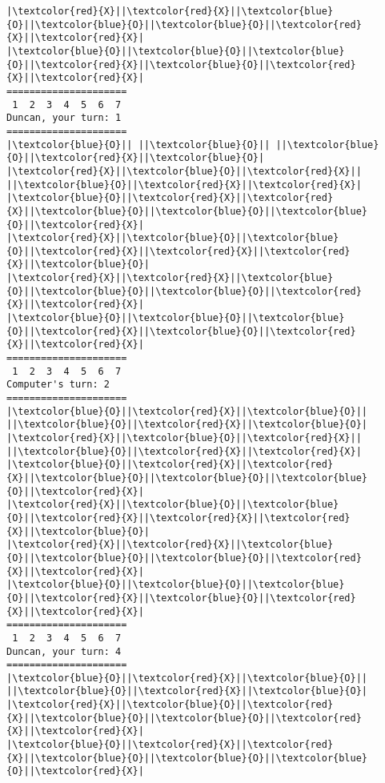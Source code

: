 \documentclass{article}
\begin{document}
\begin{Verbatim}[commandchars=\\\{\}]
|\textcolor{red}{X}||\textcolor{red}{X}||\textcolor{blue}{O}||\textcolor{blue}{O}||\textcolor{blue}{O}||\textcolor{red}{X}||\textcolor{red}{X}|
|\textcolor{blue}{O}||\textcolor{blue}{O}||\textcolor{blue}{O}||\textcolor{red}{X}||\textcolor{blue}{O}||\textcolor{red}{X}||\textcolor{red}{X}|
=====================
 1  2  3  4  5  6  7
Duncan, your turn: 1
=====================
|\textcolor{blue}{O}|| ||\textcolor{blue}{O}|| ||\textcolor{blue}{O}||\textcolor{red}{X}||\textcolor{blue}{O}|
|\textcolor{red}{X}||\textcolor{blue}{O}||\textcolor{red}{X}|| ||\textcolor{blue}{O}||\textcolor{red}{X}||\textcolor{red}{X}|
|\textcolor{blue}{O}||\textcolor{red}{X}||\textcolor{red}{X}||\textcolor{blue}{O}||\textcolor{blue}{O}||\textcolor{blue}{O}||\textcolor{red}{X}|
|\textcolor{red}{X}||\textcolor{blue}{O}||\textcolor{blue}{O}||\textcolor{red}{X}||\textcolor{red}{X}||\textcolor{red}{X}||\textcolor{blue}{O}|
|\textcolor{red}{X}||\textcolor{red}{X}||\textcolor{blue}{O}||\textcolor{blue}{O}||\textcolor{blue}{O}||\textcolor{red}{X}||\textcolor{red}{X}|
|\textcolor{blue}{O}||\textcolor{blue}{O}||\textcolor{blue}{O}||\textcolor{red}{X}||\textcolor{blue}{O}||\textcolor{red}{X}||\textcolor{red}{X}|
=====================
 1  2  3  4  5  6  7
Computer's turn: 2
=====================
|\textcolor{blue}{O}||\textcolor{red}{X}||\textcolor{blue}{O}|| ||\textcolor{blue}{O}||\textcolor{red}{X}||\textcolor{blue}{O}|
|\textcolor{red}{X}||\textcolor{blue}{O}||\textcolor{red}{X}|| ||\textcolor{blue}{O}||\textcolor{red}{X}||\textcolor{red}{X}|
|\textcolor{blue}{O}||\textcolor{red}{X}||\textcolor{red}{X}||\textcolor{blue}{O}||\textcolor{blue}{O}||\textcolor{blue}{O}||\textcolor{red}{X}|
|\textcolor{red}{X}||\textcolor{blue}{O}||\textcolor{blue}{O}||\textcolor{red}{X}||\textcolor{red}{X}||\textcolor{red}{X}||\textcolor{blue}{O}|
|\textcolor{red}{X}||\textcolor{red}{X}||\textcolor{blue}{O}||\textcolor{blue}{O}||\textcolor{blue}{O}||\textcolor{red}{X}||\textcolor{red}{X}|
|\textcolor{blue}{O}||\textcolor{blue}{O}||\textcolor{blue}{O}||\textcolor{red}{X}||\textcolor{blue}{O}||\textcolor{red}{X}||\textcolor{red}{X}|
=====================
 1  2  3  4  5  6  7
Duncan, your turn: 4
=====================
|\textcolor{blue}{O}||\textcolor{red}{X}||\textcolor{blue}{O}|| ||\textcolor{blue}{O}||\textcolor{red}{X}||\textcolor{blue}{O}|
|\textcolor{red}{X}||\textcolor{blue}{O}||\textcolor{red}{X}||\textcolor{blue}{O}||\textcolor{blue}{O}||\textcolor{red}{X}||\textcolor{red}{X}|
|\textcolor{blue}{O}||\textcolor{red}{X}||\textcolor{red}{X}||\textcolor{blue}{O}||\textcolor{blue}{O}||\textcolor{blue}{O}||\textcolor{red}{X}|

\end{Verbatim}
\end{document}
